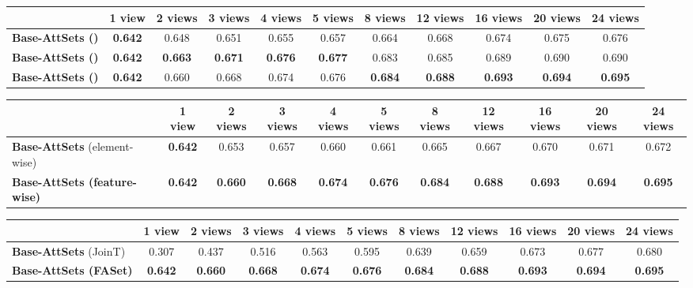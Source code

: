 \documentclass[twocolumn]{svjour3}    \pdfoutput=1
\newcommand{\nickname}{AttSets}
\newcommand{\faset}{FASet}
\begin{document}
\begin{table*}[t]
\caption{ \small{Mean IoU of \nickname{} variants on all 13 categories in ShapeNet testing split.}}
\centering
\label{tab:iou_variants}
\tabcolsep=0.112cm
\begin{tabular}{ l|cccccccccc}
\hline
&1 view&2 views&3 views& 4 views&5 views&8 views&12 views&16 views&20 views&24 views \\
\hline
\textbf{Base-\nickname{} ()}&\textbf{0.642}&0.648&0.651&0.655&0.657&0.664&0.668&0.674&0.675&0.676\\
\textbf{Base-\nickname{} ()}&\textbf{0.642}&\textbf{0.663}&\textbf{0.671}&\textbf{0.676}&\textbf{0.677}&0.683&0.685&0.689&0.690&0.690 \\
\textbf{Base-\nickname{} ()} &\textbf{0.642}&0.660&0.668&0.674&0.676&\textbf{0.684}
&\textbf{0.688}&\textbf{0.693}&\textbf{0.694}&\textbf{0.695} \\
\hline
\end{tabular}
\vspace{-0.1cm}
\end{table*}

\begin{table*}[t]
\caption{ \small{Mean IoU of all 13 categories in ShapeNet testing split for feature-wise and element-wise attentional aggregation.}}
\centering
\label{tab:iou_fw_ew}
\tabcolsep=0.078cm
\begin{tabular}{ l|cccccccccc}
\hline
&1 view&2 views&3 views& 4 views&5 views&8 views&12 views&16 views&20 views&24 views \\
\hline
\textbf{Base-\nickname{}} \scriptsize{(element-wise)} &\textbf{0.642}&0.653&0.657&0.660&0.661&0.665&0.667&0.670&0.671&0.672\\
\textbf{Base-\nickname{} \scriptsize{(feature-wise)}} &\textbf{0.642}&\textbf{0.660}&\textbf{0.668}&\textbf{0.674}&\textbf{0.676}&\textbf{0.684}
&\textbf{0.688}&\textbf{0.693}&\textbf{0.694}&\textbf{0.695} \\
\hline
\end{tabular}
\vspace{-0.1cm}
\end{table*}

\begin{table*}[t]
\caption{ \small{Mean IoU of different training algorithms on all 13 categories in ShapeNet testing split.}}
\centering
\label{tab:iou_train_alg}
\tabcolsep=0.11cm
\begin{tabular}{ l|cccccccccc}
\hline
&1 view&2 views&3 views& 4 views&5 views&8 views&12 views&16 views&20 views&24 views \\
\hline
\textbf{Base-\nickname{}} (JoinT)&0.307&0.437&0.516&0.563&0.595&0.639&0.659&0.673&0.677&0.680\\
\textbf{Base-\nickname{} (\faset{})} &\textbf{0.642}&\textbf{0.660}&\textbf{0.668}&\textbf{0.674}&\textbf{0.676}&\textbf{0.684}
&\textbf{0.688}&\textbf{0.693}&\textbf{0.694}&\textbf{0.695} \\
\hline
\end{tabular}
\vspace{-0.3cm}
\end{table*}
\end{document}
